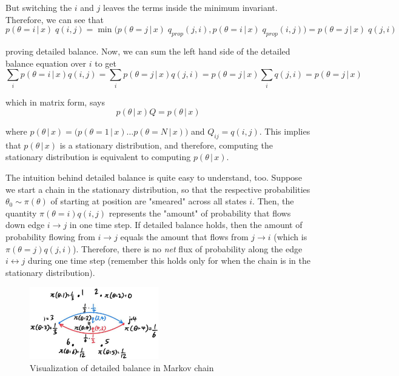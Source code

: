 \documentclass{article}
\begin{document}
  But switching the $i$ and $j$ leaves the terms inside the minimum invariant. Therefore, we can see that
  \begin{equation}
    p(\theta = i\,|\,x)\; q(i, j) = \min \big( p(\theta = j\,|\,x)\; q_{prop} (j, i), p(\theta = i\,|\,x) \; q_{prop} (i, j) \big) = p(\theta = j\,|\,x)\; q(j, i)
  \end{equation}

  proving detailed balance. Now, we can sum the left hand side of the detailed balance equation over $i$ to get
  \begin{equation}
    \sum_i p(\theta = i\,|\,x) q(i, j) = \sum_i p(\theta = j\,|\,x) q(j, i) = p(\theta = j\,|\,x) \sum_i q(j, i) = p(\theta = j\,|\,x)
  \end{equation}

  which in matrix form, says
  \begin{equation}
    p(\theta\,|\,x) Q = p(\theta\,|\,x)
  \end{equation}

  where $p(\theta\,|\,x) = \big( p(\theta=1\,|\,x) \ldots p(\theta=N\,|\,x)\big)$ and $Q_{ij} = q(i, j)$. This implies that $p(\theta\,|\,x)$ is a stationary distribution, and therefore, computing the stationary distribution is equivalent to computing $p(\theta\,|\,x)$.

  The intuition behind detailed balance is quite easy to understand, too. Suppose we start a chain in the stationary distribution, so that the respective probabilities $\theta_0 \sim \pi(\theta)$ of starting at position are "smeared" across all states $i$. Then, the quantity $\pi(\theta = i) q (i, j)$ represents the "amount" of probability that flows down edge $i \rightarrow j$ in one time step. If detailed balance holds, then the amount of probability flowing from $i \rightarrow j$ equals the amount that flows from $j \rightarrow i$ (which is $\pi(\theta = j) q(j, i)$). Therefore, there is no \textit{net} flux of probability along the edge $i \leftrightarrow j$ during one time step (remember this holds only for when the chain is in the stationary distribution).

  \begin{figure}[H]
    \centering
    \includegraphics[width=0.5\textwidth]{img/Detailed_Balance.jpg}
    \caption{Visualization of detailed balance in Markov chain}
  \end{figure}
\end{document}
